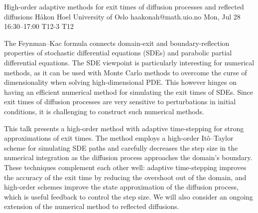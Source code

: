 \documentclass[12pt,lettersize,oneside]{book} %
\begin{document}
\begin{talk}
  {High-order adaptive methods for exit times of diffusion processes and reflected diffusions}%
  {H{\aa}kon Hoel}%
  {University of Oslo}%
  {haakonah@math.uio.no}%
  {}%
  {}%
  {Mon, Jul 28 16:30--17:00}%
  {T12-3}%
  {T12}%
  {}%
  
    
   
\medskip
The Feynman--Kac formula connects domain-exit and boundary-reflection properties of stochastic differential equations (SDEs) and parabolic partial differential equations. The SDE viewpoint is particularly interesting for numerical methods, as it can be used with Monte Carlo methods to overcome the curse of dimensionality when solving high-dimensional PDE. This however hinges on having an efficient numerical method for simulating the exit times of SDEs. Since exit times of diffusion processes are very sensitive to perturbations in initial conditions, it is challenging to construct such numerical methods.

This talk presents a high-order method with adaptive time-stepping for strong approximations of exit times. The method employs a high-order It\^o--Taylor scheme for simulating SDE paths and carefully decreases the step size in the numerical integration as the diffusion process approaches the domain's boundary. These techniques complement each other well: adaptive time-stepping improves the accuracy of the exit time by reducing the overshoot out of the domain, and high-order schemes improve the state approximation of the diffusion process, which is useful feedback to control the step size. We will also consider an ongoing extension of the numerical method to reflected diffusions.

\end{talk}
\end{document}
